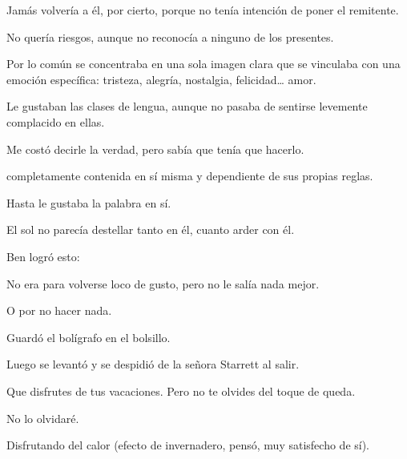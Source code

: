 \sk
Jamás volvería a él,
por cierto, porque no tenía intención de poner el
remitente.

\sk
No quería riesgos, aunque no
reconocía a ninguno de los presentes. 

\sk
Por lo común
se concentraba en una sola imagen clara que se
vinculaba con una emoción específica: tristeza,
alegría, nostalgia, felicidad\ldots{} amor.

\sk
Le gustaban las clases de lengua,
aunque no pasaba de sentirse levemente
complacido en ellas.

\sk
Me costó decirle la verdad, pero sabía que tenía que hacerlo. 

\sk
completamente contenida en sí misma y
dependiente de sus propias reglas.

\sk
Hasta le gustaba la palabra en sí.

\sk
El sol no parecía destellar tanto en él,
cuanto arder con él.

\sk
Ben logró esto: 

\sk
No era para volverse loco de gusto, pero no le
salía nada mejor.

\sk
O por no hacer nada. 

\sk
Guardó el bolígrafo en el bolsillo. 

\sk
Luego se levantó y se
despidió de la señora Starrett al salir.

\sk
Que disfrutes de
tus vacaciones. Pero no te olvides del toque de queda.

\sk
No lo olvidaré. 

\sk
Disfrutando del calor (efecto
de invernadero, pensó, muy satisfecho de sí).

